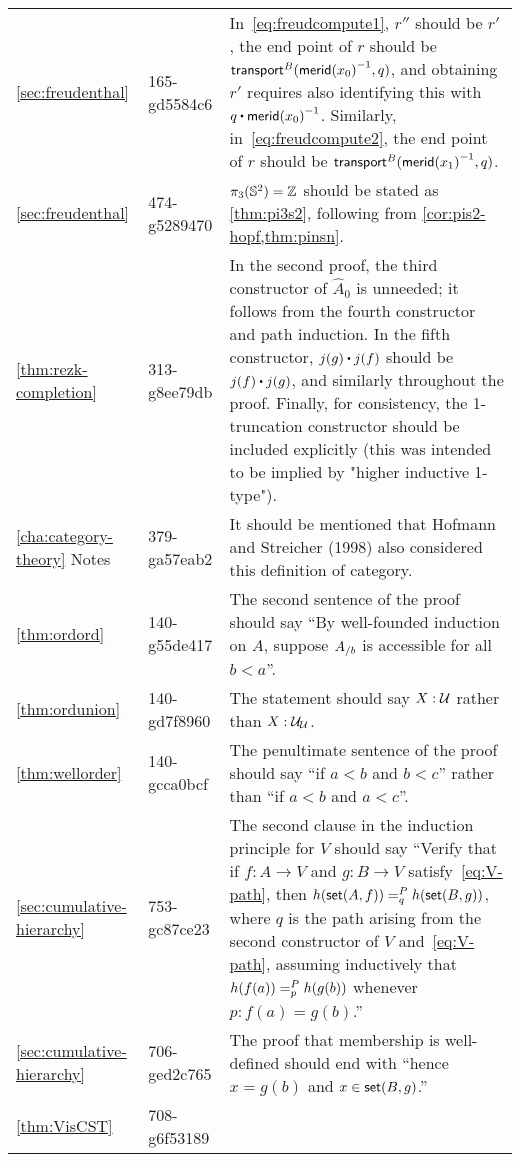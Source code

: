 \documentclass[
%
%
11pt %
]{article}
\begin{document}
\begin{longtable}{llp{10.5cm}}
  \cref{sec:freudenthal}
  & 165-gd5584c6
  & In~\eqref{eq:freudcompute1}, $r''$ should be $r'$, the end point of $r$ should be $\transfib{B}{\opp{\merid(x_0)}}{q}$, and obtaining $r'$ requires also identifying this with $q \ct \opp{\merid(x_0)}$.
  Similarly, in~\eqref{eq:freudcompute2}, the end point of $r$ should be $\transfib{B}{\opp{\merid(x_1)}}{q}$.\\
  \cref{sec:freudenthal}
  & 474-g5289470
  & $\pi_3(\Sn^2)=\Z$ should be stated as \cref{thm:pi3s2}, following from \cref{cor:pis2-hopf,thm:pinsn}.\\
  \cref{thm:rezk-completion}
  & 313-g8ee79db
  & In the second proof, the third constructor of $\widehat A_0$ is unneeded; it follows from the fourth constructor and path induction.
  In the fifth constructor, $j(g)\ct j(f)$ should be $j(f)\ct j(g)$, and similarly throughout the proof.
  Finally, for consistency, the 1-truncation constructor should be included explicitly (this was intended to be implied by "higher inductive 1-type").\\
  \cref{cha:category-theory} Notes
  & 379-ga57eab2
  & It should be mentioned that Hofmann and Streicher (1998) also considered this definition of category.\\
  \cref{thm:ordord}
  & 140-g55de417
  & The second sentence of the proof should say ``By well-founded induction on $A$, suppose $\ordsl A b$ is accessible for all $b<a$''.\\
  \cref{thm:ordunion}
  & 140-gd7f8960
  & The statement should say $X:\UU$ rather than $X:\UU_\UU$.\\
  \cref{thm:wellorder}
  & 140-gcca0bcf
  & The penultimate sentence of the proof should say ``if $a<b$ and $b<c$'' rather than ``if $a<b$ and $a<c$''.\\
  \cref{sec:cumulative-hierarchy}
  & 753-gc87ce23
  & The second clause in the induction principle for $V$ should say ``Verify that if $f : A \to V$ and $g : B \to V$ satisfy~\eqref{eq:V-path}, then $\dpath{P}{q}{h(\vset(A,f))}{h(\vset(B,g))}$, where $q$ is the path arising from the second constructor of $V$ and~\eqref{eq:V-path}, assuming inductively that $\dpath{P}{p}{h(f(a))}{h(g(b))}$ whenever $p:f(a)=g(b)$.''\\
  \cref{sec:cumulative-hierarchy}
  & 706-ged2c765
  & The proof that membership is well-defined should end with ``hence $x = g(b)$ and $x \in \vset(B,g)$.''\\
  \cref{thm:VisCST}
  & 708-g6f53189

\end{longtable}
\end{document}
